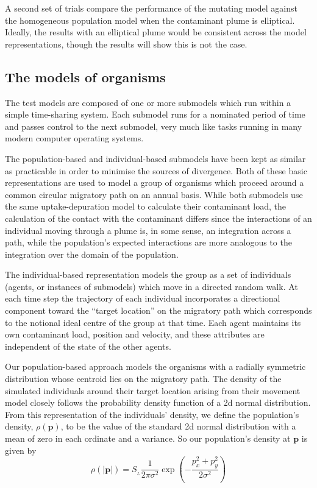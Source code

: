 \documentclass{article}
\newcommand{\tmem}[1]{{\em #1\/}}
\newcommand{\tmmathbf}[1]{\ensuremath{\boldsymbol{#1}}}
\begin{document}
A second set of trials compare the performance of the mutating model against
the homogeneous population model when the contaminant plume is elliptical.
Ideally, the results with an elliptical plume would be consistent across the
model representations, though the results will show this is not the case.

\subsection{The models of organisms}



The test models are composed of one or more submodels which run within a
simple time-sharing system. Each submodel runs for a nominated period of time
and passes control to the next submodel, very much like tasks running in many
modern computer operating systems.

The population-based and individual-based submodels have been kept as similar
as practicable in order to minimise the sources of divergence. Both of these
basic representations are used to model a group of organisms which proceed
around a common circular migratory path on an annual basis. While both
submodels use the same uptake-depuration model to calculate their contaminant
load, the calculation of the contact with the contaminant differs since the
interactions of an individual moving through a plume is, in some sense, an
integration across a path, while the population's expected interactions are
more analogous to the integration over the domain of the population.

The individual-based representation models the group as a set of individuals
(agents, or instances of submodels) which move in a directed random walk. At
each time step the trajectory of each indi{\tmem{{\tmem{}}}}vidual
incorporates a directional component toward the ``target location'' on the
migratory path which corresponds to the notional ideal centre of the group at
that time. Each agent maintains its own contaminant load, position and
velocity, and these attributes are independent of the state of the other
agents.

Our population-based approach models the organisms with a radially symmetric
distribution whose centroid lies on the migratory path. The density of the
simulated individuals around their target location arising from their movement
model closely follows the probability density function of a 2d normal
distribution. From this representation of the individuals' density, we define
the population's density, $\rho ( \tmmathbf{p})$, to be the value of the
standard 2d normal distribution with a mean of zero in each ordinate and a
variance. So our population's density at $\tmmathbf{p}$ is given by
\[ \rho (| \tmmathbf{p} |) = S_{_L }^{} \frac{1}{2 \pi \sigma^2} \exp \left( -
   \frac{p_x^2 + p_y^2}{2 \sigma^2} \right) \]
\end{document}
